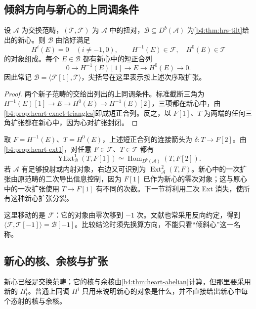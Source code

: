 \subsection{倾斜方向与新心的上同调条件}
\label{b4:subsec:1904:03}

\begin{corollary}\label{b4:cor:hrs-heart-description}
	设 \(\mathcal A\) 为交换范畴，\((\mathcal T,\mathcal F)\) 为 \(\mathcal A\) 中的扭对，\(\mathcal B\subseteq D^b(\mathcal A)\) 为\cref{b4:thm:hrs-tilt}给出的新心。则 \(\mathcal B\) 由恰好满足
	\[
		H^i(E)=0\quad(i\ne-1,0),\qquad H^{-1}(E)\in\mathcal F,\quad H^0(E)\in\mathcal T
	\]
	的对象组成。每个 \(E\in\mathcal B\) 都有新心中的短正合列
	\[
		0\longrightarrow H^{-1}(E)[1]\longrightarrow E \longrightarrow H^0(E)\longrightarrow0.
	\]
	因此常记 \(\mathcal B=\langle\mathcal F[1],\mathcal T\rangle\)，尖括号在这里表示按上述次序取扩张。
\end{corollary}
\begin{proof}
	两个新子范畴的交给出列出的上同调条件。标准截断三角为 \(H^{-1}(E)[1]\to E\to H^0(E)\to H^{-1}(E)[2]\)，三项都在新心中，由\cref{b4:prop:heart-exact-triangles}即成短正合列。反之，以 \(F[1]\)、\(T\) 为两端的任何三角扩张都在新心中，因为心对扩张封闭。
\end{proof}

取 \(F=H^{-1}(E)\)、\(T=H^0(E)\)，上述短正合列的连接箭头为 \(\delta:T\to F[2]\)。由\cref{b4:prop:heart-ext1}，对任意 \(F\in\mathcal F\)、\(T\in\mathcal T\) 都有
\[
	\operatorname{YExt}_{\mathcal B}^1(T,F[1]) \simeq\operatorname{Hom}_{D^b(\mathcal A)}(T,F[2]).
\]
若 \(\mathcal A\) 有足够投射或内射对象，右边又可识别为 \(\operatorname{Ext}_{\mathcal A}^2(T,F)\)。新心中的一次扩张由原范畴的二次导出信息控制，因为 \(F[1]\) 已作为新心的零次对象；这与原心中的一次扩张使用 \(T\to F[1]\) 有不同的次数。下一节将利用二次 Ext 消失，使所有这种新心扩张分裂。

\ProseParagraphBreak
这里移动的是 \(\mathcal F\)：它的对象由零次移到 \(-1\) 次。文献也常采用反向约定，得到 \(\langle\mathcal F,\mathcal T[-1]\rangle=\mathcal B[-1]\)。比较结论时须先换算方向，不能只看“倾斜心”这一名称。

\subsection{新心的核、余核与扩张}
\label{b4:subsec:1904:04}

新心已经是交换范畴；它的核与余核由\cref{b4:thm:heart-abelian}计算，但那里要采用新的 \(H_t^i\)。普通上同调 \(H^i\) 只用来说明新心的对象是什么，并不直接给出新心中每个态射的核与余核。

